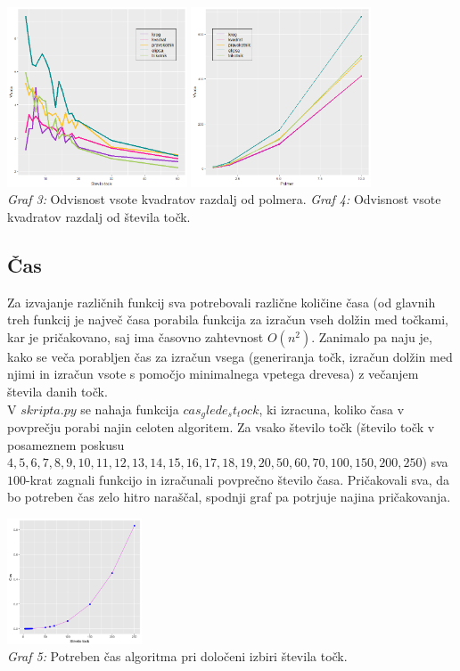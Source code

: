 \documentclass[a4paper]{report}
\begin{document}
\includegraphics[width=0.4\textwidth]{graf1} \hspace{20mm}
\includegraphics[width=0.4\textwidth]{graf2} \\
\hspace{10mm} \scriptsize{\textit{Graf 3: }  Odvisnost vsote kvadratov razdalj od polmera.} \hspace{20mm}
\scriptsize{\textit{Graf 4: }  Odvisnost vsote kvadratov razdalj od števila točk.}


\subsection{Čas}

Za izvajanje različnih funkcij sva potrebovali različne količine časa (od glavnih treh funkcij je največ časa porabila funkcija za izračun vseh dolžin med točkami, kar je pričakovano, saj ima časovno zahtevnost $O(n^2)$. Zanimalo pa naju je, kako se veča porabljen čas za izračun vsega (generiranja točk, izračun dolžin med njimi in izračun vsote s pomočjo minimalnega vpetega drevesa) z večanjem števila danih točk. \\
V \colorbox{gray!10}{$skripta.py$} se nahaja funkcija $cas_glede_st_tock$, ki izracuna, koliko časa v povprečju porabi najin celoten algoritem. Za vsako število točk (število točk v posameznem poskusu $4, 5, 6, 7, 8, 9, 10, 11, 12, 13, 14, 15, 16, 17, 18, 19, 20, 50, 60, 70, 100, 150, 200, 250$) sva $100$-krat zagnali funkcijo in izračunali povprečno število časa. Pričakovali sva, da bo potreben čas zelo hitro naraščal, spodnji graf pa potrjuje najina pričakovanja.
\begin{center}
\includegraphics[width=0.3\textwidth]{graf_cas} \\
\scriptsize{\textit{Graf 5: }  Potreben čas algoritma pri določeni izbiri števila točk.}
\end{center}
\end{document}
